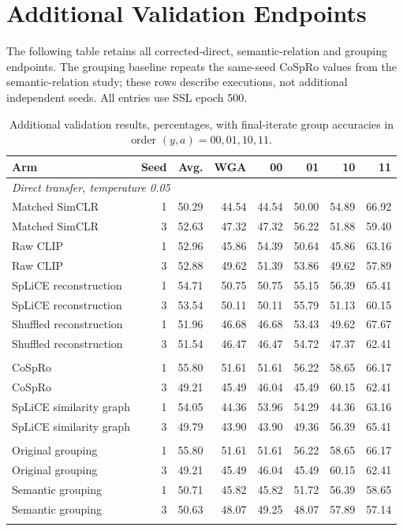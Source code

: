 \documentclass{article}
\begin{document}
\section{Additional Validation Endpoints}
The following table retains all corrected-direct, semantic-relation and
grouping endpoints. The grouping baseline repeats the same-seed CoSpRo
values from the semantic-relation study; these rows describe executions,
not additional independent seeds. All entries use SSL epoch 500.
\begin{table}[htbp]
\centering\small
\setlength{\tabcolsep}{4pt}
\caption{Additional validation results, percentages, with final-iterate group accuracies in order $(y,a)=00,01,10,11$.}
\begin{tabular}{lrrrrrrr}
\toprule
Arm & Seed & Avg. & WGA & 00 & 01 & 10 & 11 \\
\midrule
\multicolumn{8}{l}{\textit{Direct transfer, temperature 0.05}} \\
Matched SimCLR & 1 & 50.29 & 44.54 & 44.54 & 50.00 & 54.89 & 66.92 \\
Matched SimCLR & 3 & 52.63 & 47.32 & 47.32 & 56.22 & 51.88 & 59.40 \\
Raw CLIP & 1 & 52.96 & 45.86 & 54.39 & 50.64 & 45.86 & 63.16 \\
Raw CLIP & 3 & 52.88 & 49.62 & 51.39 & 53.86 & 49.62 & 57.89 \\
SpLiCE reconstruction & 1 & 54.71 & 50.75 & 50.75 & 55.15 & 56.39 & 65.41 \\
SpLiCE reconstruction & 3 & 53.54 & 50.11 & 50.11 & 55.79 & 51.13 & 60.15 \\
Shuffled reconstruction & 1 & 51.96 & 46.68 & 46.68 & 53.43 & 49.62 & 67.67 \\
Shuffled reconstruction & 3 & 51.54 & 46.47 & 46.47 & 54.72 & 47.37 & 62.41 \\
\addlinespace
\multicolumn{8}{l}{\textit{Relation-choice ablation}} \\
CoSpRo & 1 & 55.80 & 51.61 & 51.61 & 56.22 & 58.65 & 66.17 \\
CoSpRo & 3 & 49.21 & 45.49 & 46.04 & 45.49 & 60.15 & 62.41 \\
SpLiCE similarity graph & 1 & 54.05 & 44.36 & 53.96 & 54.29 & 44.36 & 63.16 \\
SpLiCE similarity graph & 3 & 49.79 & 43.90 & 43.90 & 49.36 & 56.39 & 65.41 \\
\addlinespace
\multicolumn{8}{l}{\textit{Concept-grouping screen}} \\
Original grouping & 1 & 55.80 & 51.61 & 51.61 & 56.22 & 58.65 & 66.17 \\
Original grouping & 3 & 49.21 & 45.49 & 46.04 & 45.49 & 60.15 & 62.41 \\
Semantic grouping & 1 & 50.71 & 45.82 & 45.82 & 51.72 & 56.39 & 58.65 \\
Semantic grouping & 3 & 50.63 & 48.07 & 49.25 & 48.07 & 57.89 & 57.14 \\
\addlinespace
\bottomrule
\end{tabular}
\label{tab:additionalgroups}
\end{table}
\end{document}
